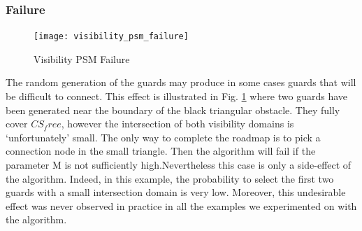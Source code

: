 \documentclass[11pt]{article}
\begin{document}
\subsubsection{Failure}
\begin{figure}[h]
\texttt{[image: visibility\_psm\_failure]}
\centering
\caption{Visibility PSM Failure}
\label{fig:vispsm_failure}
\end{figure}
The random generation of the guards may produce in some cases guards that will
be difficult to connect. This effect is illustrated in Fig. \ref{fig:vispsm_failure} where two guards have
been generated near the boundary of the black triangular obstacle. They fully cover
$CS_free$, however the intersection of both visibility domains is ‘unfortunately’ small.
The only way to complete the roadmap is to pick a connection node in the small
triangle. Then the algorithm will fail if the parameter M is not sufficiently high.Nevertheless this case is only a side-effect of the algorithm. Indeed, in this example,
the probability to select the first two guards with a small intersection domain is very
low. Moreover, this undesirable effect was never observed in practice in all the
examples we experimented on with the algorithm.
\end{document}

